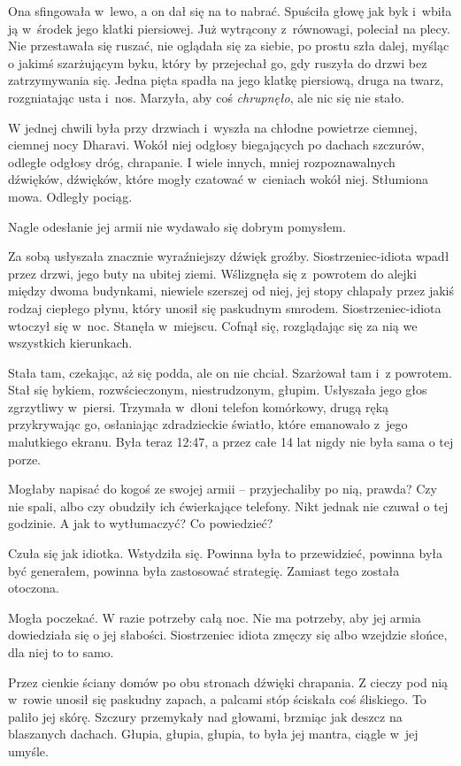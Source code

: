 \documentclass[oneside,polish,11pt,rmheadings]{mwbk}
\begin{document}
Ona sfingowała w~lewo, a on dał się na to nabrać. Spuściła głowę jak byk i~wbiła ją w~środek jego klatki piersiowej. Już wytrącony z~równowagi, poleciał na plecy. Nie przestawała się ruszać, nie oglądała się za siebie, po prostu szła dalej, myśląc o jakimś szarżującym byku, który by przejechał go, gdy ruszyła do drzwi bez zatrzymywania się. Jedna pięta spadła na jego klatkę piersiową, druga na twarz, rozgniatając usta i~nos. Marzyła, aby coś \textit{chrupnęło}, ale nic się nie stało. 


W jednej chwili była przy drzwiach i~wyszła na chłodne powietrze ciemnej, ciemnej nocy Dharavi. Wokół niej odgłosy biegających po dachach szczurów, odległe odgłosy dróg, chrapanie. I wiele innych, mniej rozpoznawalnych dźwięków, dźwięków, które mogły czatować w~cieniach wokół niej. Stłumiona mowa. Odległy pociąg. 


Nagle odesłanie jej armii nie wydawało się dobrym pomysłem. 


Za sobą usłyszała znacznie wyraźniejszy dźwięk groźby. Siostrzeniec-idiota wpadł przez drzwi, jego buty na ubitej ziemi. Wślizgnęła się z~powrotem do alejki między dwoma budynkami, niewiele szerszej od niej, jej stopy chlapały przez jakiś rodzaj ciepłego płynu, który unosił się paskudnym smrodem. Siostrzeniec-idiota wtoczył się w~noc. Stanęła w~miejscu. Cofnął się, rozglądając się za nią we wszystkich kierunkach. 


Stała tam, czekając, aż się podda, ale on nie chciał. Szarżował tam i~z powrotem. Stał się bykiem, rozwścieczonym, niestrudzonym, głupim. Usłyszała jego głos zgrzytliwy w~piersi. Trzymała w~dłoni telefon komórkowy, drugą ręką przykrywając go, osłaniając zdradzieckie światło, które emanowało z~jego malutkiego ekranu. Była teraz 12:47, a przez całe 14 lat nigdy nie była sama o tej porze. 


Mogłaby napisać do kogoś ze swojej armii -- przyjechaliby po nią, prawda? Czy nie spali, albo czy obudziły ich ćwierkające telefony. Nikt jednak nie czuwał o tej godzinie. A jak to wytłumaczyć? Co powiedzieć? 


Czuła się jak idiotka. Wstydziła się. Powinna była to przewidzieć, powinna była być generałem, powinna była zastosować strategię. Zamiast tego została otoczona. 


Mogła poczekać. W razie potrzeby całą noc. Nie ma potrzeby, aby jej armia dowiedziała się o jej słabości. Siostrzeniec idiota zmęczy się albo wzejdzie słońce, dla niej to to samo. 


Przez cienkie ściany domów po obu stronach dźwięki chrapania. Z cieczy pod nią w~rowie unosił się paskudny zapach, a palcami stóp ściskała coś śliskiego. To paliło jej skórę. Szczury przemykały nad głowami, brzmiąc jak deszcz na blaszanych dachach. Głupia, głupia, głupia, to była jej mantra, ciągle w~jej umyśle. 
\end{document}
